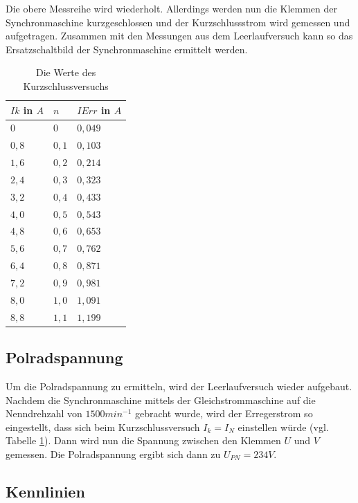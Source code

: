 \documentclass{report}
\begin{document}
Die obere Messreihe wird wiederholt. Allerdings werden nun die Klemmen der Synchronmaschine kurzgeschlossen und der Kurzschlussstrom wird gemessen und aufgetragen. Zusammen mit den Messungen aus dem Leerlaufversuch kann so das Ersatzschaltbild der Synchronmaschine ermittelt werden.
\begin{table}[!ht]
	\centering
	\begin{tabular}{lll}
		\hline
		$Ik$ in $A$ & $n$   & $IErr$ in $A$ \\ \hline
		$0$         & $0$   & $0,049$       \\
		$0,8$       & $0,1$ & $0,103$       \\
		$1,6$       & $0,2$ & $0,214$       \\
		$2,4$       & $0,3$ & $0,323$       \\
		$3,2$       & $0,4$ & $0,433$       \\
		$4,0$       & $0,5$ & $0,543$       \\
		$4,8$       & $0,6$ & $0,653$       \\
		$5,6$       & $0,7$ & $0,762$       \\
		$6,4$       & $0,8$ & $0,871$       \\
		$7,2$       & $0,9$ & $0,981$       \\
		$8,0$       & $1,0$ & $1,091$       \\
		$8,8$       & $1,1$ & $1,199$       \\ \hline
	\end{tabular}
	\caption{Die Werte des Kurzschlussversuchs}
	\label{tab:kurzschlussversuch}
\end{table}

\subsection{Polradspannung}
\label{sec:polradspannung}

Um die Polradspannung zu ermitteln, wird der Leerlaufversuch wieder aufgebaut. Nachdem die Synchronmaschine mittels der Gleichstrommaschine auf die Nenndrehzahl von $1500min^{-1}$ gebracht wurde, wird der Erregerstrom so eingestellt, dass sich beim Kurzschlussversuch $I_{k} = I_{N}$ einstellen würde (vgl. Tabelle \ref{tab:kurzschlussversuch}). Dann wird nun die Spannung zwischen den Klemmen $U$ und $V$ gemessen. Die Polradspannung ergibt sich dann zu $U_{PN} = 234V$.

\subsection{Kennlinien}
\label{sec:kennlinien}
\end{document}
